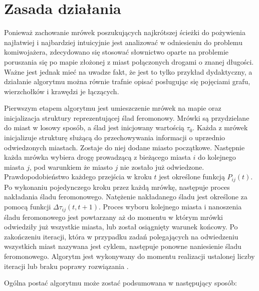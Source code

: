 {    %
    \section{Zasada działania}
    {
        Ponieważ zachowanie mrówek poszukujących najkrótszej ścieżki do pożywienia najłatwiej i najbardziej intuicyjnie
        jest analizować w odniesieniu do problemu komiwojażera, zdecydowano się stosować słownictwo oparte na problemie
        poruszania się po mapie złożonej z miast połączonych drogami o znanej długości. Ważne jest jednak mieć na uwadze
        fakt, że jest to tylko przykład dydaktyczny, a działanie algorytmu można równie trafnie opisać posługując się
        pojęciami grafu, wierzchołków i krawędzi je łączących.

        Pierwszym etapem algorytmu jest umieszczenie mrówek na mapie oraz inicjalizacja struktury reprezentującej ślad
        feromonowy. Mrówki są przydzielane do miast w losowy sposób, a ślad jest inicjowany wartością $\tau_0$. Każda z
        mrówek inicjalizuje strukturę służącą do przechowywania informacji o uprzednio odwiedzonych miastach. Zostaje do
        niej dodane miasto początkowe. Następnie każda mrówka wybiera drogę prowadzącą z bieżącego miasta $i$ do
        kolejnego miasta $j$, pod warunkiem że miasto $j$ nie zostało już odwiedzone. Prawdopodobieństwo każdego
        przejścia w kroku $t$ jest określone funkcją $P_{ij}(t)$. Po wykonaniu pojedynczego kroku przez każdą mrówkę,
        następuje proces nakładania śladu feromonowego. Natężenie nakładanego śladu jest określone za pomocą funkcji
        $\Delta\tau_{ij}(t, t+1)$. Proces wyboru kolejnego miasta i nanoszenia śladu feromonowego jest powtarzany aż do
        momentu w którym mrówki odwiedziły już wszystkie miasta, lub został osiągnięty warunek końcowy. Po zakończeniu
        iteracji, która w przypadku zadań polegających na odwiedzeniu wszystkich miast nazywana jest cyklem, następuje
        ponowne naniesienie śladu feromonowego. Algorytm jest wykonywany do momentu realizacji ustalonej liczby iteracji
        lub braku poprawy rozwiązania \cite{Dorigo1991AntSA}.

        Ogólna postać algorytmu może zostać podsumowana w następujący sposób:

}}
